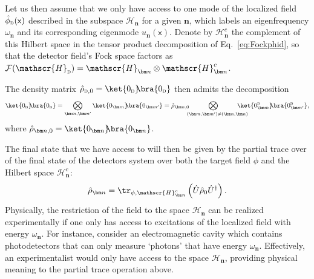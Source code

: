 \documentclass[letterpaper,12pt,titlepage,oneside,final]{book}
\newcommand{\mf}{\mathsf}%
\renewcommand{\r}{\hat{\rho}}
\newcommand{\tc}[1]{\textsc{#1}}
\begin{document}


    Let us then assume that we only have access to one mode of the localized field $\hat{\phi}_\tc{d}(\mf x)$ described in the subspace $\mathscr{H}_{\bm n}$ for a given $\bm n$, which labels an eigenfrequency $\omega_{\bm n}$ and its corresponding eigenmode $u_{\bm n}(\mf x)$. Denote by $\mathscr{H}_{\bm n}^c$ the complement of this Hilbert space in the tensor product decomposition of Eq.~\eqref{eq:Fockphid}, so that the detector field's Fock space factors as $\mathcal{F}(\mathscr{H}_\tc{d}) = \mathscr{H}_{\bm n}\otimes \mathscr{H}_{\bm n}^c$.

    The  density matrix $\hat{\rho}_{\tc{d},0} = \ket{0_\tc{d}}\!\!\bra{0_\tc{d}}$ then admits the decomposition
    \begin{equation}
        \ket{0_\tc{d}}\!\!\bra{0_\tc{d}} = \bigotimes_{\bm m, \bm m'}  \ket{0_{\bm m}}\!\!\bra{0_{\bm m'}} = \hat{\rho}_{\bm n,0}\!\!\!\!\!\!\!\!\!\!\!\bigotimes_{\:\:\:\:\:\:\:(\bm m,\bm m')\neq (\bm n, \bm n)} \!\!\!\!\!\!\!\! \!\!\!\ket{0_{\bm m}^\tc{d}}\!\!\bra{0_{\bm m'}^\tc{d}},
    \end{equation}
    where $\r_{\bm n,0} = \ket{0_{\bm n}}\!\!\bra{0_{\bm n}}$.
    
    The final state that we have access to will then be given by the partial trace over of the final state of the detectors system over both the target field $\phi$ and the Hilbert space $\mathscr{H}_{\bm n}^c$:
    \begin{equation}
        \hat{\rho}_{\bm n} = \tr_{\phi,\mathscr{H}_{\bm n}^c}\left(\hat{U} \hat{\rho}_0\hat{U}^\dagger\right).
    \end{equation}
    Physically, the restriction of the field to the space $\mathscr{H}_{\bm n}$ can be realized experimentally if one only has access to excitations of the localized field with energy $\omega_{\bm n}$. For instance, consider an electromagnetic cavity which contains photodetectors that can only measure `photons' that have energy $\omega_{\bm n}$. Effectively, an experimentalist would only have access to the space $\mathscr{H}_{\bm n}$, providing physical meaning to the partial trace operation above.
    
    
    
\end{document}
